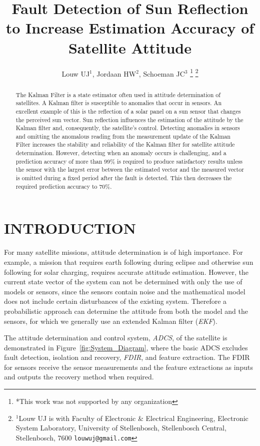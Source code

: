 \documentclass[letterpaper, 10 pt, conference]{ieeeconf}  %
\title{\LARGE \bf
Fault Detection of Sun Reflection to Increase Estimation Accuracy of Satellite Attitude
}
\author{Louw UJ$^{1}$, Jordaan HW$^{2}$, Schoeman JC$^{3}$%
\thanks{*This work was not supported by any organization}%
\thanks{$^{1}$Louw UJ is with Faculty of Electronic \& Electrical Engineering, Electronic System            Laboratory, University of Stellenbosch, Stellenbosch Central, Stellenbosch, 7600
        {\tt\small louwuj@gmail.com}}%
}
\begin{document}
\maketitle
\thispagestyle{empty}
\pagestyle{empty}


\begin{abstract}

The Kalman Filter is a state estimator often used in attitude determination of satellites. A Kalman filter is susceptible to anomalies that occur in sensors. An excellent example of this is the reflection of a solar panel on a sun sensor that changes the perceived sun vector. Sun reflection influences the estimation of the attitude by the Kalman filter and, consequently, the satellite's control. Detecting anomalies in sensors and omitting the anomalous reading from the measurement update of the Kalman Filter increases the stability and reliability of the Kalman filter for satellite attitude determination. However, detecting when an anomaly occurs is challenging, and a prediction accuracy of more than $99\%$ is required to produce satisfactory results unless the sensor with the largest error between the estimated vector and the measured vector is omitted during a fixed period after the fault is detected. This then decreases the required prediction accuracy to $70\%$.

\end{abstract}

\section{INTRODUCTION}
For many satellite missions, attitude determination is of high importance. For example, a mission that requires earth following during eclipse and otherwise sun following for solar charging, requires accurate attitude estimation. However, the current state vector of the system can not be determined with only the use of models or sensors, since the sensors contain noise and the mathematical model does not include certain disturbances of the existing system. Therefore a probabilistic approach can determine the attitude from both the model and the sensors, for which we generally use an extended Kalman filter (\emph{EKF}).

The attitude determination and control system, \emph{ADCS}, of the satellite is demonstrated in Figure~\ref{fig:System_Diagram}, where the basic ADCS excludes fault detection, isolation and recovery, \emph{FDIR}, and feature extraction. The FDIR for sensors receive the sensor measurements and the feature extractions as inputs and outputs the recovery method when required. 
\end{document}
